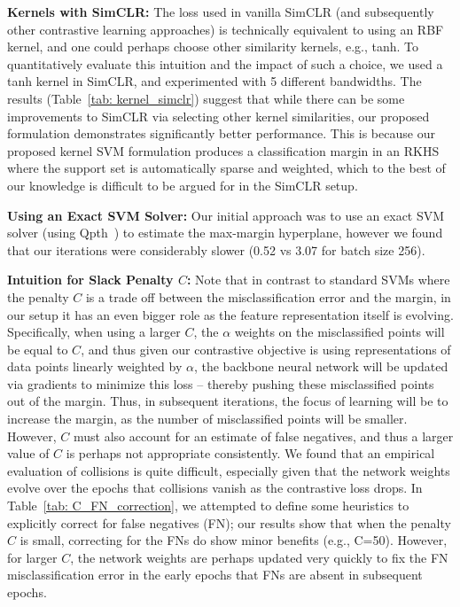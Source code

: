 \documentclass[letterpaper]{article} \usepackage{aaai22}  \usepackage{times}  \usepackage{helvet}  \usepackage{courier}  \usepackage[hyphens]{url}  \usepackage{graphicx} \urlstyle{rm} \def\UrlFont{\rm}  \usepackage{natbib}  \usepackage{caption} \DeclareCaptionStyle{ruled}{labelfont=normalfont,labelsep=colon,strut=off} \frenchspacing  \setlength{\pdfpagewidth}{8.5in}  \setlength{\pdfpageheight}{11in}
\begin{document}
\noindent\textbf{Kernels with SimCLR:}
The loss used in vanilla SimCLR (and subsequently other contrastive learning approaches) is technically equivalent to using an RBF kernel, and one could perhaps choose other similarity kernels, e.g., tanh. To quantitatively evaluate this intuition and the impact of such a choice, we used a tanh kernel in SimCLR, and experimented with 5 different bandwidths. The results (Table~\ref{tab: kernel_simclr}) suggest that while there can be some improvements to SimCLR via selecting other kernel similarities, our proposed formulation demonstrates significantly better performance. This is because our proposed kernel SVM formulation produces a classification margin in an RKHS where the support set is automatically sparse and weighted, which to the best of our knowledge is difficult to be argued for in the SimCLR setup.

\noindent\textbf{Using an Exact SVM Solver:}
Our initial approach was to use an exact SVM solver (using Qpth~\cite{amos2017optnet}) to estimate the max-margin hyperplane, however we found that our iterations were considerably slower (0.52 vs 3.07 for batch size 256).

\noindent\textbf{Intuition for Slack Penalty $C$:}
Note that in contrast to standard SVMs where the penalty $C$ is a trade off between the misclassification error and the margin, in our setup it has an even bigger role as the feature representation itself is evolving. Specifically, when using a larger $C$, the $\alpha$ weights on the misclassified points will be equal to $C$, and thus given our contrastive objective is using representations of data points linearly weighted by $\alpha$, the backbone neural network will be updated via gradients to minimize this loss -- thereby pushing these misclassified points out of the margin. Thus, in subsequent iterations, the focus of learning will be to increase the margin, as the number of misclassified points will be smaller. However, $C$ must also account for an estimate of false negatives, and thus a larger value of $C$ is perhaps not appropriate consistently. We found that an empirical evaluation of collisions is quite difficult, especially given that the network weights evolve over the epochs that collisions vanish as the contrastive loss drops. In Table~\ref{tab: C_FN_correction}, we attempted to define some heuristics to explicitly correct for false negatives (FN); our results show that when the penalty $C$ is small, correcting for the FNs do show minor benefits (e.g., C=50). However, for larger $C$, the network weights are perhaps updated very quickly to fix the FN misclassification error in the early epochs that FNs are absent in subsequent epochs. 
\end{document}
